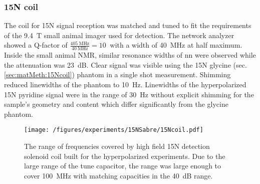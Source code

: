         \subsubsection{15N coil}
    The coil for 15N signal reception was matched and tuned to fit the requirements of the \SI{9.4}{\tesla} small animal imager used for detection. The network analyzer showed a Q-factor of $\frac{\SI{405}{\mega\hertz}}{\SI{40}{\mega\hertz}} = \SI{10}{}$ with a width of \SI{40}{\mega\hertz} at half maximum. Inside the small animal NMR, similar resonance widths of nn were observed while the attenuation was \SI{23}{\deci\bel}. Clear signal was visible using the 15N glycine (sec. \ref{sec:matMeth:15Ncoil}) phantom in a single shot measurement. Shimming reduced linewidths of the phantom to \SI{10}{\hertz}. Linewidths of the hyperpolarized 15N pyridine signal were in the range of \SI{30}{\hertz} without explicit shimming for the sample's geometry and content which differ significantly from the glycine phantom.
                \begin{figure}
                    \texttt{[image: /figures/experiments/15NSabre/15Ncoil.pdf]}
                    \caption[15N coil network analysis]{The range of frequencies covered by high field 15N detection solenoid coil built for the hyperpolarized experiments. Due to the large range of the tune capacitor, the range was large enough to cover \SI{100}{\mega\hertz} with matching capacities in the \SI{40}{\deci\bel} range.}
                    \label{fig:results:15N:networkAnalysisCoil}
                \end{figure}
